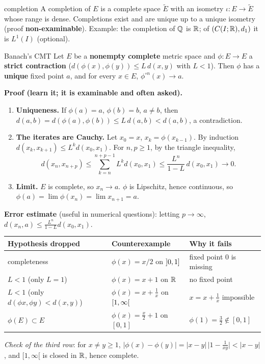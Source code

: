\begin{defn}{completion}
A completion of $E$ is a complete space $\tilde E$ with an isometry $\iota:E\to\tilde E$ whose
range is dense. Completions exist and are unique up to a unique isometry (proof
\textbf{non-examinable}). Example: the completion of $\mathbb Q$ is $\mathbb R$; of $(C(I;\mathbb R),d_1)$ it is
$L^1(I)$ (optional).
\end{defn}

\begin{thm}{Banach's CMT}
Let $E$ be a \textbf{nonempty complete} metric space and $\phi:E\to E$ a \textbf{strict
contraction} ($d(\phi(x),\phi(y))\le L\,d(x,y)$ with $L<1$). Then $\phi$ has a \textbf{unique}
fixed point $a$, and for every $x\in E$, $\phi^{\circ n}(x)\to a$.
\end{thm}
\begin{answer}
\textbf{Proof (learn it; it is examinable and often asked).}
\begin{enumerate}
\item \textbf{Uniqueness.} If $\phi(a)=a$, $\phi(b)=b$, $a\ne b$, then
  $d(a,b)=d(\phi(a),\phi(b))\le L\,d(a,b)<d(a,b)$, a contradiction.
\item \textbf{The iterates are Cauchy.} Let $x_0=x$, $x_k=\phi(x_{k-1})$. By induction
  $d(x_k,x_{k+1})\le L^k d(x_0,x_1)$. For $n,p\ge1$, by the triangle inequality,
  \[d(x_n,x_{n+p})\le\sum_{k=n}^{n+p-1}L^kd(x_0,x_1)\le\frac{L^n}{1-L}\,d(x_0,x_1)\to0.\]
\item \textbf{Limit.} $E$ is complete, so $x_n\to a$. $\phi$ is Lipschitz, hence continuous, so
  $\phi(a)=\lim\phi(x_n)=\lim x_{n+1}=a$.
\end{enumerate}
\textbf{Error estimate} (useful in numerical questions): letting $p\to\infty$,
$d(x_n,a)\le\frac{L^n}{1-L}d(x_0,x_1)$.
\end{answer}

\begin{center}
\renewcommand{\arraystretch}{1.2}
\begin{tabular}{@{}lll@{}}\toprule
Hypothesis dropped & Counterexample & Why it fails\\\midrule
completeness & $\phi(x)=x/2$ on $\mathopen{]}0,1\mathclose{]}$ & fixed point $0$ is missing\\
$L<1$ (only $L=1$) & $\phi(x)=x+1$ on $\mathbb R$ & no fixed point\\
$L<1$ (only $d(\phi x,\phi y)<d(x,y)$) & $\phi(x)=x+\frac1x$ on $\mathopen{[}1,\infty\mathclose{[}$ & $x=x+\frac1x$ impossible\\
$\phi(E)\subset E$ & $\phi(x)=\frac x2+1$ on $[0,1]$ & $\phi(1)=\frac32\notin[0,1]$\\\bottomrule
\end{tabular}
\end{center}
\emph{Check of the third row}: for $x\ne y\ge1$,
$|\phi(x)-\phi(y)|=|x-y|\,\big|1-\frac1{xy}\big|<|x-y|$, and $[1,\infty[$ is closed in $\mathbb R$, hence
complete.


